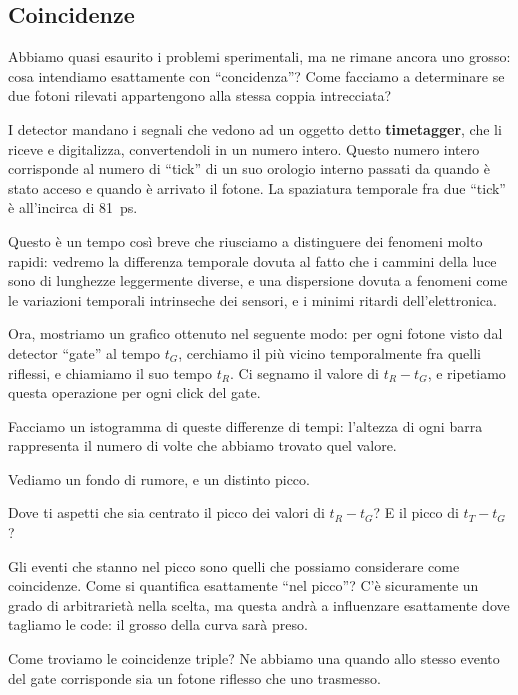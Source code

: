 \documentclass[a4paper,12pt]{article}
\begin{document}
\subsection{Coincidenze}

Abbiamo quasi esaurito i problemi sperimentali, ma ne rimane ancora uno grosso: cosa intendiamo esattamente con ``concidenza''? Come facciamo a determinare se due fotoni rilevati appartengono alla stessa coppia intrecciata?

I detector mandano i segnali che vedono ad un oggetto detto \textbf{timetagger}, che li riceve e digitalizza, convertendoli in un numero intero. Questo numero intero corrisponde al numero di ``tick'' di un suo orologio interno passati da quando è stato acceso e quando è arrivato il fotone.
La spaziatura temporale fra due ``tick'' è all'incirca di \SI{81}{ps}.

Questo è un tempo così breve che riusciamo a distinguere dei fenomeni molto rapidi: vedremo la differenza temporale dovuta al fatto che i cammini della luce sono di lunghezze leggermente diverse, e una dispersione dovuta a fenomeni come le variazioni temporali intrinseche dei sensori, e i minimi ritardi dell'elettronica.

Ora, mostriamo un grafico ottenuto nel seguente modo: per ogni fotone visto dal detector ``gate'' al tempo \(t_G\), cerchiamo il più vicino temporalmente fra quelli riflessi, e chiamiamo il suo tempo \(t_R\). 
Ci segnamo il valore di \(t_R - t_G\), e ripetiamo questa operazione per ogni click del gate. 

Facciamo un istogramma di queste differenze di tempi: l'altezza di ogni barra rappresenta il numero di volte che abbiamo trovato quel valore.


Vediamo un fondo di rumore, e un distinto picco.

\begin{exo}
    Dove ti aspetti che sia centrato il picco dei valori di \(t_R - t_G\)? E il picco di \(t_T - t_G\)? 
\end{exo}


Gli eventi che stanno nel picco sono quelli che possiamo considerare come coincidenze. 
Come si quantifica esattamente ``nel picco''? C'è sicuramente un grado di arbitrarietà nella scelta, ma questa andrà a influenzare esattamente dove tagliamo le code: il grosso della curva sarà preso.

Come troviamo le coincidenze triple? Ne abbiamo una quando allo stesso evento del gate corrisponde sia un fotone riflesso che uno trasmesso.


\printbibliography
\end{document}
